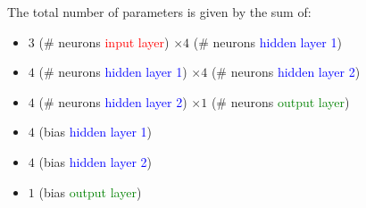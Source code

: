 The total number of parameters is given by the sum of:
\begin{itemize}
    \item $3$ (\# neurons \textcolor{red}{input layer}) $\times 4$ (\# neurons \textcolor{blue}{hidden layer 1})
    \item $4$ (\# neurons \textcolor{blue}{hidden layer 1}) $\times 4$ (\# neurons \textcolor{blue}{hidden layer 2})
    \item $4$ (\# neurons \textcolor{blue}{hidden layer 2}) $\times 1$ (\# neurons \textcolor{green}{output layer})
    \item $4$ (bias \textcolor{blue}{hidden layer 1})
    \item $4$ (bias \textcolor{blue}{hidden layer 2})
    \item $1$ (bias \textcolor{green}{output layer})
\end{itemize}

